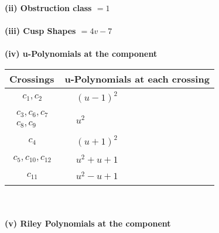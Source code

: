 \documentclass[1p]{elsarticle_modified}
\theoremstyle{definition}
\begin{document}
\flushleft \textbf{(ii) Obstruction class $= 1$}\\~\\
\flushleft \textbf{(iii) Cusp Shapes $= 4 v-7$}\\~\\
\newpage\renewcommand{\arraystretch}{1}
\flushleft \textbf{(iv) u-Polynomials at the component}\newline \\
\begin{tabular}{m{50pt}|m{274pt}}
Crossings & \hspace{64pt}u-Polynomials at each crossing \\
\hline $$\begin{aligned}c_{1},c_{2}\end{aligned}$$&$\begin{aligned}
&(u-1)^2
\end{aligned}$\\
\hline $$\begin{aligned}c_{3},c_{6},c_{7}\\c_{8},c_{9}\end{aligned}$$&$\begin{aligned}
&u^2
\end{aligned}$\\
\hline $$\begin{aligned}c_{4}\end{aligned}$$&$\begin{aligned}
&(u+1)^2
\end{aligned}$\\
\hline $$\begin{aligned}c_{5},c_{10},c_{12}\end{aligned}$$&$\begin{aligned}
&u^2+u+1
\end{aligned}$\\
\hline $$\begin{aligned}c_{11}\end{aligned}$$&$\begin{aligned}
&u^2- u+1
\end{aligned}$\\
\hline
\end{tabular}\\~\\
\newpage\renewcommand{\arraystretch}{1}
\flushleft \textbf{(v) Riley Polynomials at the component}\newline \\
\end{document}
